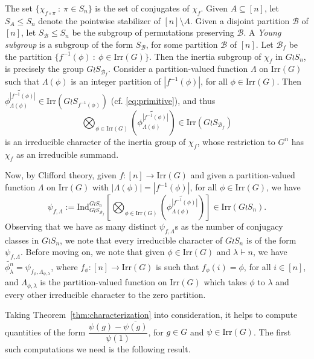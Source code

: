 \documentclass{amsart}
\theoremstyle{plain}
\theoremstyle{remark}\newtheorem{con}[theorem]{Construction}
\theoremstyle{remark} \newtheorem*{remark}{Remark}
\theoremstyle{remark} \newtheorem{example}{Example}
\newcommand{\mcal}{\mathcal}
\newcommand{\mrm}{\mathrm}
\newcommand{\ov}{\overline}
\newcommand{\irr}{\mathrm{Irr}}
\begin{document}
The set $\{\chi_{f \circ \pi}\ :\ \pi \in S_{n} \}$ is the set of conjugates of $\chi_{f}$. Given $A\subseteq [n]$, let $S_{A} \leq S_{n}$ denote the pointwise stabilizer of $[n]\setminus A$. Given a disjoint partition $\mcal{B}$ of  $[n]$, let $S_{\mcal{B}} \leq S_{n}$ be the subgroup of permutations preserving $\mcal{B}$. A {\it Young subgroup} is a subgroup of the form $S_{\mcal{B}}$, for some partition $\mcal{B}$ of $[n]$.
Let $\mcal{B}_{f}$ be the partition $\{ f^{-1}(\phi)\ :\ \phi\in \irr(G)\}$. Then the inertia subgroup of $\chi_{f}$ in $G \wr S_{n}$, is precisely the group $G \wr S_{\mcal{B}_{f}}$. Consider a partition-valued function $\Lambda$ on $\irr(G)$ such that $\Lambda(\phi)$ is an integer partition of $|f^{-1}(\phi)|$, for all $\phi \in \irr(G)$. Then $ \widetilde{\phi^{|f^{-1}(\phi)|}_{\Lambda(\phi)}} \in \irr(G \wr S_{f^{-1}(\phi)})$ (cf. \eqref{eq:primitive}), and thus \[\bigotimes_{\phi \in \irr(G)} \left(\widetilde{\phi^{|f^{-1}(\phi)|}_{\Lambda(\phi)}} \right) \in \irr(G \wr S_{\mcal{B}_{f}})\] is an irreducible character of the inertia group of $\chi_{f}$, whose restriction to $G^{n}$ has $\chi_{f}$ as an irreducible summand. 

Now, by Clifford theory, given $f:[n] \to \irr(G)$ and given a partition-valued function $\Lambda$ on $\irr(G)$ with $|\Lambda(\phi)|=|f^{-1}(\phi)|$, for all $\phi \in \irr(G)$, we have
\begin{equation}\label{eq:charwreathproduct}
\psi_{f,\Lambda}:= \mrm{Ind}_{G \wr S_{\mcal{B}_{f}}}^{G \wr S_{n}} \left[ \bigotimes_{\phi \in \irr(G)} \left(\widetilde{\phi^{|f^{-1}(\phi)|}_{\Lambda(\phi)}} \right)\right] \in \irr(G\wr S_{n}).
\end{equation}
Observing that we have as many distinct $\psi_{f,\Lambda}$s as the number of conjugacy classes in $G\wr S_{n}$, we note that every irreducible character of $G \wr S_{n}$ is of the form $\psi_{f,\Lambda}$. Before moving on, we note that given $\phi \in \irr(G)$ and $\lambda \vdash n$, we have $\widetilde{\phi^{n}_{\lambda}}= \psi_{f_{\phi}, \Lambda_{\phi,\lambda}}$, where $f_{\phi}:[n] \to \irr(G)$ is such that $f_{\phi}(i)=\phi$, for all $i \in [n]$, and $\Lambda_{\phi,\lambda}$ is the partition-valued function on $\irr(G)$ which takes $\phi$ to $\lambda$ and every other irreducible character to the zero partition.

Taking Theorem~\ref{thm:characterization} into consideration, it helps to compute quantities of the form $\dfrac{\psi(g)-\ov{\psi(g)}}{\psi(1)}$, for $g \in G$ and $\psi \in \irr(G)$. The first such computations we need is the following result.
\end{document}
